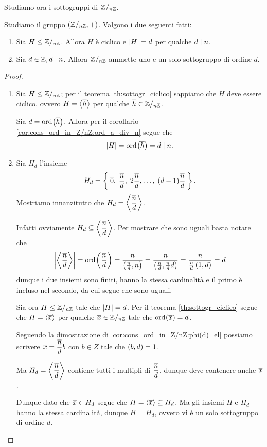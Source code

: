 Studiamo ora i sottogruppi di $\mathbb{Z}/_{n\mathbb{Z}}$.

\begin{proposition}
     \label{prop:sgr_Z/nZ}
    Studiamo il gruppo $(\mathbb{Z}/_{n\mathbb{Z}}, +)$. Valgono i due seguenti fatti:
    \begin{enumerate}[label={(\roman*)}, ref={\theproposition: (\roman*)}]
        \item \label{prop:sgr_Z/nZ:ciclico_ord_d} Sia $H \leq \mathbb{Z}/_{n\mathbb{Z}}$. Allora $H$ è ciclico e $\lvert H\rvert = d$ per qualche $d \mid n$.
        \item \label{prop:sgr_Z/nZ:unosolo_ord_d} Sia $d \in \mathbb{Z}, d \mid n$. Allora $\mathbb{Z}/_{n\mathbb{Z}}$ ammette uno e un solo sottogruppo di ordine $d$.
    \end{enumerate}
\end{proposition}

\begin{proof}
    \begin{enumerate} [label={(\roman*)}]
        \item Sia $H \leq \mathbb{Z}/_{n\mathbb{Z}}$; per il teorema \ref{th:sottogr_ciclico} sappiamo che $H$ deve essere ciclico, ovvero $H = \gen*{\eqcl h}$ per qualche $\eqcl h \in \Zmod n$.
        
        Sia $d = \ord{\eqcl h}$. Allora per il corollario \ref{cor:cons_ord_in_Z/nZ:ord_a_div_n} segue che \[
            \abs{H} = \ord{\eqcl h} = d \divides n.   
        \]
        \item Sia $H_d$ l'insieme \[
            H_d = \set{\eqcl 0,\; \frac{\eqcl n}{d},\; 2\frac{\eqcl n}{d}, \dots,\; (d-1)\frac{\eqcl n}{d}}.    
        \] Mostriamo innanzitutto che $H_d = \gen*{\dfrac{\eqcl{n}}{d}}$.
        
        Infatti ovviamente $H_d \subseteq \gen*{\dfrac{\eqcl n}{d}}$. Per mostrare che sono uguali basta notare che \[
            \abs*{\gen*{\frac{\eqcl n}{d}}} = \ord{\frac{\eqcl n}{d}} = \frac{n}{\mcd{\frac{n}{d}}{n}} = \frac{n}{\mcd{\frac{n}{d}}{\frac{n}{d}d}} = \frac{n}{\frac{n}{d}\mcd{1}{d}} = d
        \] dunque i due insiemi sono finiti, hanno la stessa cardinalità e il primo è incluso nel secondo, da cui segue che sono uguali.

        Sia ora $H \leq \mathbb{Z}/_{n\mathbb{Z}}$ tale che $\lvert H\rvert = d$. Per il teorema \ref{th:sottogr_ciclico} segue che $H = \gen*{\eqcl x}$ per qualche $\eqcl x \in \Zmod n$ tale che $\ord{\eqcl x} = d$.

        Seguendo la dimostrazione di \ref{cor:cons_ord_in_Z/nZ:phi(d)_el} possiamo scrivere $\eqcl x = \dfrac{\eqcl n}{d}b$ con $b \in Z$ tale che $\left(b, d\right) = 1$.

        Ma $H_d = \gen*{\dfrac{\eqcl n}{d}}$ contiene tutti i multipli di $\dfrac{\eqcl n}{d}$, dunque deve contenere anche $\eqcl x$.

        Dunque dato che $\eqcl x \in H_d$ segue che $H = \gen*{\eqcl x} \subseteq H_d$. Ma gli insiemi $H$ e $H_d$ hanno la stessa cardinalità, dunque $H = H_d$, ovvero vi è un solo sottogruppo di ordine $d$. \qedhere
    \end{enumerate}
\end{proof}